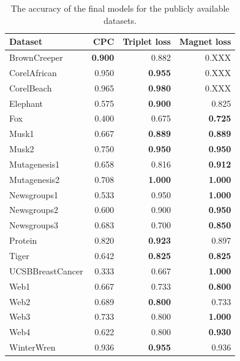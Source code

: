 \begin{table}[h!]
  \centering
  \begin{tabular}{lrrr}
    \toprule
    Dataset          & CPC            & Triplet loss   & Magnet loss \\
    \midrule
    BrownCreeper     & \textbf{0.900} & 0.882          & 0.XXX \\
    CorelAfrican     & 0.950          & \textbf{0.955} & 0.XXX \\
    CorelBeach       & 0.965          & \textbf{0.980} & 0.XXX \\
    Elephant         & 0.575          & \textbf{0.900} & 0.825 \\
    Fox              & 0.400          & 0.675          & \textbf{0.725} \\
    Musk1            & 0.667          & \textbf{0.889} & \textbf{0.889} \\
    Musk2            & 0.750          & \textbf{0.950} & \textbf{0.950} \\
    Mutagenesis1     & 0.658          & 0.816          & \textbf{0.912} \\
    Mutagenesis2     & 0.708          & \textbf{1.000} & \textbf{1.000} \\
    Newsgroups1      & 0.533          & 0.950          & \textbf{1.000} \\
    Newsgroups2      & 0.600          & 0.900          & \textbf{0.950} \\
    Newsgroups3      & 0.683          & 0.700          & \textbf{0.850} \\
    Protein          & 0.820          & \textbf{0.923} & 0.897 \\
    Tiger            & 0.642          & \textbf{0.825} & \textbf{0.825} \\
    UCSBBreastCancer & 0.333          & 0.667          & \textbf{1.000} \\
    Web1             & 0.667          & 0.733          & \textbf{0.800} \\
    Web2             & 0.689          & \textbf{0.800} & 0.733 \\
    Web3             & 0.733          & 0.800          & \textbf{1.000} \\
    Web4             & 0.622          & 0.800          & \textbf{0.930} \\
    WinterWren       & 0.936          & \textbf{0.955} & 0.936 \\
    \bottomrule
  \end{tabular}
  \caption{The accuracy of the final models for the publicly available datasets.}\label{tab:public-accuracy}
\end{table}

